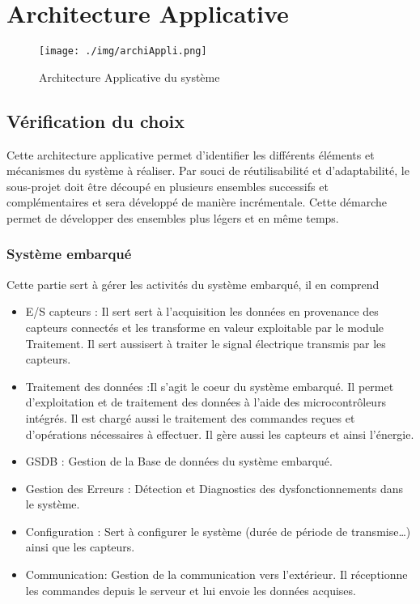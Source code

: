 \section{Architecture Applicative}

\begin{figure}[h]
\centering
\texttt{[image: ./img/archiAppli.png]}
\caption{Architecture Applicative du système}
\end{figure}

\subsection{Vérification du choix}
	Cette architecture applicative permet d'identifier les différents éléments et mécanismes du système à réaliser. Par souci de réutilisabilité et d’adaptabilité, le sous-projet doit être découpé en plusieurs ensembles successifs et complémentaires et sera développé de manière incrémentale. Cette démarche permet de développer des ensembles plus légers et en même temps.

\subsubsection{Système embarqué} Cette partie sert à gérer les activités du système embarqué, il en comprend

	\begin{itemize}
	    \item E/S capteurs : Il sert sert à l'acquisition les données en provenance des capteurs connectés et les transforme en valeur exploitable par le module Traitement. Il sert aussisert à traiter le signal électrique transmis par les capteurs.
	    \item Traitement des données :Il s'agit le coeur du système embarqué.  Il permet d'exploitation et de traitement des données à l’aide des microcontrôleurs intégrés. Il est chargé aussi le traitement des commandes reçues et d'opérations nécessaires à effectuer. Il gère aussi les capteurs et ainsi l'énergie.
	    \item GSDB : Gestion de la Base de données du système embarqué. 
	    \item Gestion des Erreurs : Détection et Diagnostics des dysfonctionnements dans le système.
	    \item Configuration : Sert à configurer le système (durée de période de transmise…) ainsi que les capteurs.
	    \item Communication: Gestion de la communication vers l’extérieur. Il réceptionne les commandes depuis le serveur et lui envoie les données acquises. 
	\end{itemize}

